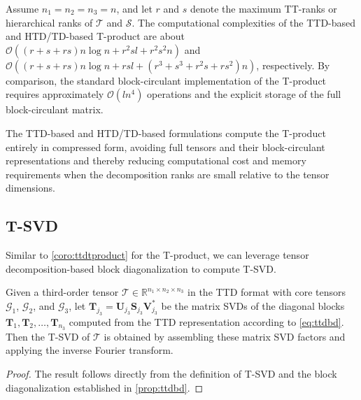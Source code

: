 \documentclass[onefignum,onetabnum]{siamart250211}
\begin{document}
\begin{remark}
Assume $n_1 = n_2 = n_3 = n$, and  let $r$ and $s$ denote the maximum TT-ranks or hierarchical ranks of $\mathscr{T}$ and $\mathscr{S}$. The computational complexities of the TTD-based and HTD/TD-based T-product are about  $\mathcal{O}((r+s+rs)n\log n
+
r^2sl
+
r^2s^2n
)$ and $\mathcal{O}(
(r+s+rs)n\log n + rsl +
(r^3 + s^3 + r^2s + rs^2)n)$, respectively. By comparison, the standard block-circulant implementation of the T-product requires approximately %
$\mathcal{O}(l n^4)$ operations and the explicit storage of the full block-circulant matrix. 
\end{remark}


The TTD-based and HTD/TD-based formulations compute the T-product entirely in compressed form, avoiding full tensors and their block-circulant representations and thereby reducing computational cost and memory requirements when the decomposition ranks are small relative to the tensor dimensions.

\subsection{T-SVD} Similar to \cref{coro:ttdtproduct} for the T-product, we can  leverage tensor decomposition-based block diagonalization to compute T-SVD. 

\begin{corollary}
    Given a third-order tensor $\mathscr{T}\in\mathbb{R}^{n_1\times n_2\times n_3}$ in the TTD format with core tensors $\mathscr{G}_1$, $\mathscr{G}_2$, and $\mathscr{G}_3$, let $\textbf{T}_{j_3}=\textbf{U}_{j_3}\textbf{S}_{j_3}\textbf{V}_{j_3}^*$ be the matrix SVDs of the diagonal blocks $\textbf{T}_1,\textbf{T}_2,\dots,\textbf{T}_{n_3}$ computed from the TTD representation according to \eqref{eq:ttdbd}. Then the T-SVD of $\mathscr{T}$ is obtained by assembling these matrix SVD factors and applying the inverse Fourier transform.
\end{corollary}
\begin{proof}
    The result follows directly from the definition of T-SVD and the block diagonalization established in \cref{prop:ttdbd}.
\end{proof}
\end{document}
